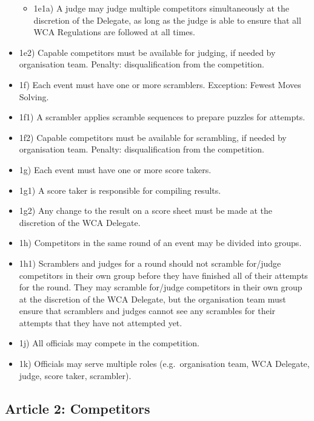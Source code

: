 \begin{itemize}
  \begin{itemize}
  \item
    1e1a) A judge may judge multiple competitors simultaneously at the
    discretion of the Delegate, as long as the judge is able to ensure
    that all WCA Regulations are followed at all times.
  \end{itemize}
\item
  1e2) Capable competitors must be available for judging, if needed by
  organisation team. Penalty: disqualification from the competition.
\item
  1f) Each event must have one or more scramblers. Exception: Fewest
  Moves Solving.
\item
  1f1) A scrambler applies scramble sequences to prepare puzzles for
  attempts.
\item
  1f2) Capable competitors must be available for scrambling, if needed
  by organisation team. Penalty: disqualification from the competition.
\item
  1g) Each event must have one or more score takers.
\item
  1g1) A score taker is responsible for compiling results.
\item
  1g2) Any change to the result on a score sheet must be made at the
  discretion of the WCA Delegate.
\item
  1h) Competitors in the same round of an event may be divided into
  groups.
\item
  1h1) Scramblers and judges for a round should not scramble for/judge
  competitors in their own group before they have finished all of their
  attempts for the round. They may scramble for/judge competitors in
  their own group at the discretion of the WCA Delegate, but the
  organisation team must ensure that scramblers and judges cannot see
  any scrambles for their attempts that they have not attempted yet.
\item
  1j) All officials may compete in the competition.
\item
  1k) Officials may serve multiple roles (e.g.~organisation team, WCA
  Delegate, judge, score taker, scrambler).
\end{itemize}

\subsection{ Article 2: Competitors}

